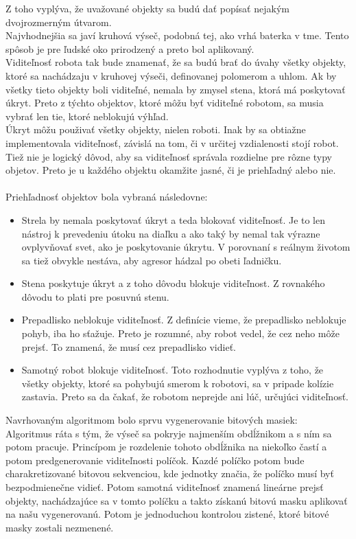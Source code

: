 Z toho vyplýva, že uvažované objekty sa budú dať popísať nejakým dvojrozmerným útvarom.\\
 Najvhodnejšia sa javí kruhová výseč, podobná tej, ako vrhá baterka v tme. Tento spôsob je pre ľudské oko prirodzený a preto bol aplikovaný.\\
Viditeľnosť robota tak bude znamenať, že sa budú brať do úvahy všetky objekty, ktoré sa nachádzaju v kruhovej výseči, definovanej polomerom a uhlom. Ak by všetky tieto objekty boli viditeľné, nemala by zmysel stena, ktorá má poskytovať úkryt. Preto z týchto objektov, ktoré môžu byť viditeľné robotom, sa musia vybrať len tie, ktoré neblokujú výhľad. \\
Úkryt môžu použivať všetky objekty, nielen roboti. Inak by sa obtiažne implementovala viditeľnosť, závislá na tom, či v určitej vzdialenosti stojí robot. Tiež nie je logický dôvod, aby sa viditeľnosť správala rozdielne pre rôzne typy objetov. Preto je u každého objektu okamžite jasné, či je priehľadný alebo nie.\\
\\
Priehľadnosť objektov bola vybraná následovne:
\begin{itemize}
\item Strela by nemala poskytovať úkryt a teda blokovať viditeľnosť. Je to len nástroj k prevedeniu útoku na diaľku a ako taký by nemal tak výrazne ovplyvňovať svet, ako je poskytovanie úkrytu. V porovnaní s reálnym životom sa tiež obvykle nestáva, aby agresor hádzal po obeti ľadničku.
\item Stena poskytuje úkryt a z toho dôvodu blokuje viditeľnost. Z rovnakého dôvodu to plati pre posuvnú stenu.
\item Prepadlisko neblokuje viditeľnosť. Z definície vieme, že prepadlisko neblokuje pohyb, iba ho sťažuje. Preto je rozumné, aby robot vedel, že cez neho môže prejsť. To znamená, že musí cez prepadlisko vidieť.
\item Samotný robot blokuje viditeľnosť. Toto rozhodnutie vyplýva z toho, že všetky objekty, ktoré sa pohybujú smerom k robotovi, sa v pripade kolízie zastavia. Preto sa da čakať, že robotom neprejde ani lúč, určujúci viditeľnosť.%
\end{itemize}
Navrhovaným algoritmom bolo sprvu vygenerovanie bitových masiek: \\
Algoritmus ráta s tým, že výseč sa pokryje najmenším obdĺžnikom a s ním sa potom pracuje. Princípom je rozdelenie tohoto obdĺžnika na niekoľko častí a potom predgenerovanie viditeľnosti políčok. Kazdé políčko potom bude charakretizované bitovou sekvenciou, kde jednotky značia, že políčko musí byť bezpodmienečne vidieť. Potom samotná viditeľnosť znamená lineárne prejsť objekty, nachádzajúce sa v tomto políčku a takto získanú bitovú masku aplikovať na našu vygenerovanú. Potom je jednoduchou kontrolou zistené, ktoré bitové masky zostali nezmenené. \\
